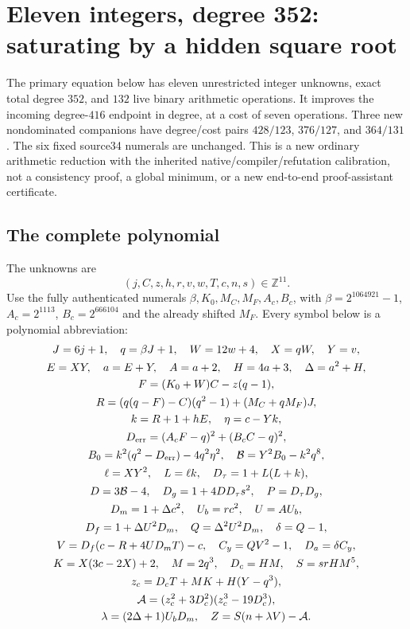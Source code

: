 \section{Eleven integers, degree 352: saturating by a hidden square root}
\label{sec:integer352}
The primary equation below has eleven unrestricted integer unknowns, exact
total degree $352$, and $132$ live binary arithmetic operations. It improves
the incoming degree-$416$ endpoint in degree, at a cost of seven operations.
Three new nondominated companions have degree/cost pairs
$428/123$, $376/127$, and $364/131$. The six fixed source34 numerals are
unchanged. This is a new ordinary arithmetic reduction with the inherited
native/compiler/refutation calibration, not a consistency proof, a global
minimum, or a new end-to-end proof-assistant certificate.

\subsection{The complete polynomial}
The unknowns are
\[
 (j,C,z,h,r,v,w,T,c,n,s)\in\mathbb Z^{11}.
\]
Use the fully authenticated numerals
$\beta,K_0,M_C,M_F,A_c,B_c$, with
$\beta=2^{1064921}-1$, $A_c=2^{1113}$, $B_c=2^{666104}$ and the already
shifted $M_F$. Every symbol below is a polynomial abbreviation:
\begin{gather*}
 J=6j+1,\quad q=\beta J+1,\quad W=12w+4,\quad X=qW,\quad Y=v,\\
 E=XY,\quad a=E+Y,\quad A=a+2,\quad H=4a+3,\quad \Delta=a^2+H,\\
 F=(K_0+W)C-z(q-1),\\
 R=(q(q-F)-C)(q^2-1)+(M_C+qM_F)J,\\
 k=R+1+hE,\quad \eta=c-Yk,\\
 D_{\rm err}=(A_cF-q)^2+(B_cC-q)^2,\\
 B_0=k^2(q^2-D_{\rm err})-4q^2\eta^2,\quad 
 \mathcal B=Y^2B_0-k^2q^8,\\
 \ell=XY^2,\quad L=\ell k,\quad D_\tau=1+L(L+k),\\
 D=3\mathcal B-4,\quad D_g=1+4DD_\tau s^2,\quad P=D_\tau D_g,\\
 D_m=1+\Delta c^2,\quad U_b=rc^2,\quad U=AU_b,\\
 D_f=1+\Delta U^2D_m,\quad Q=\Delta^2U^2D_m,\quad \delta=Q-1,\\
 V=D_f(c-R+4UD_mT)-c,\quad C_y=QV^2-1,\quad D_a=\delta C_y,\\
 K=X(3c-2X)+2,\quad M=2q^3,\quad D_c=HM,\quad S=srHM^5,\\
 z_c=D_cT+MK+H(Y-q^3),\\
 \mathcal A=(z_c^2+3D_c^2)(z_c^3-19D_c^3),\\
 \lambda=(2\Delta+1)U_bD_m,\quad Z=S(n+\lambda V)-\mathcal A.
\end{gather*}
